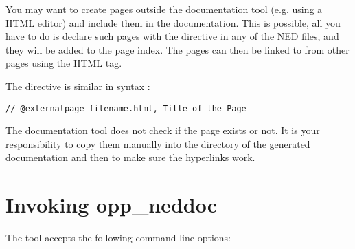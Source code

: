 You may want to create pages outside the documentation tool
(e.g. using a HTML editor) and include them in the documentation.
This is possible, all you have to do is declare such pages with
the  directive in any of the NED files, and
they will be added to the page index. The pages can then be linked to
from other pages using the HTML  tag.

The  directive is similar in syntax
:

\begin{verbatim}
// @externalpage filename.html, Title of the Page
\end{verbatim}

The documentation tool does not check if the page exists
or not. It is your responsibility to copy them manually into
the directory of the generated documentation and then to make
sure the hyperlinks work.



\section{Invoking opp\_neddoc}

The  tool accepts the following command-line options:


